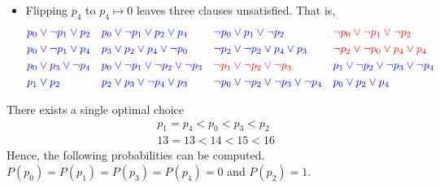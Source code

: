 \documentclass[11pt,a4paper]{article}
\begin{document}
\begin{itemize}
\item Flipping $p_4$ to $p_4 \mapsto 0$ leaves three clauses unsatisfied. That is,
\begin{align*}
&\textcolor{blue}{p_0 \lor \neg p_1 \lor p_2} & & \textcolor{blue}{p_0 \lor \neg p_1 \lor p_2 \lor p_4} & & \textcolor{blue}{\neg p_0 \lor p_1 \lor \neg p_2} & & \textcolor{red}{\neg p_0 \lor \neg p_1 \lor \neg p_2} \\
&\textcolor{blue}{ p_0 \lor \neg p_1 \lor p_4} && \textcolor{blue}{p_3 \lor p_2 \lor p_4 \lor \neg p_0} && \textcolor{blue}{\neg p_2 \lor \neg p_2 \lor p_4 \lor p_3} && \textcolor{red}{\neg p_2 \lor \neg p_0 \lor p_4 \lor p_4} \\
& \textcolor{blue}{p_0 \lor p_3 \lor \neg p_4} && \textcolor{blue}{p_0 \lor \neg p_1 \lor \neg p_2 \lor \neg p_3} && \textcolor{red}{\neg p_1 \lor \neg p_2 \lor \neg p_3} && \textcolor{blue}{p_1 \lor \neg p_2 \lor \neg p_3 \lor \neg p_4} \\
& \textcolor{blue}{p_1 \lor p_2} && \textcolor{blue}{p_2 \lor p_3 \lor \neg p_4 \lor p_3} && \textcolor{blue}{\neg p_0 \lor \neg p_2 \lor \neg p_3 \lor \neg p_4} && \textcolor{blue}{p_0 \lor p_2 \lor p_4} \\
\end{align*}
\end{itemize}
There exists a single optimal choice
\begin{equation*}
\begin{split}
&p_1 = p_4 < p_0 < p_3 < p_2 \\
& 13 = 13  <  14  < 15 <  16 
\end{split}
\end{equation*}
Hence, the following probabilities can be computed. $P(p_0)=P(p_1)=P(p_3)=P(p_4)=0$ and $P(p_2)=1$. 
\end{document}
